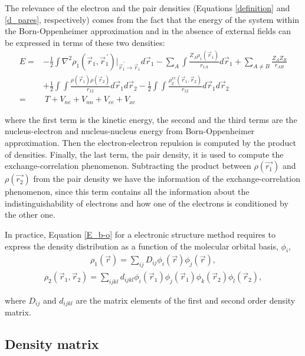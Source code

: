 The relevance of the electron and the pair densities (Equations
\ref{definition} and \ref{d_pares}, respectively) comes from the fact that the
energy of the system within the Born-Oppenheimer approximation and in the
absence of external fields can be expressed in terms of these two densities:
%
\begin{align}
  E=&-\frac{1}{2}\int\nabla^{2}\rho_{1}(\vec{r}_1,
    \vec{r}^{\,\prime}_1) \biggr |_{\vec{r}^{\,\prime}_1 \rightarrow \vec{r}_1}
    d\vec{r}_1 -\sum_{A}\int\frac{Z_A \rho_1 (\vec{r}_1)}{r_{1A}}d\vec{r}_1
    +\sum_{A\neq B}\frac{Z_A Z_{B}}{r_{AB}} \nonumber \\
  \phantom{=}&+\frac{1}{2}\int\int\frac{\rho (\vec{r}_1) \rho
    (\vec{r}_2)}{r_{12}} d\vec{r}_1 d\vec{r}_2
    -\frac{1}{2}\int\int\frac{\rho_2^{xc}(\vec{r}_1, \vec{r}_2)}{r_{12}} d\vec{r}_1
    d\vec{r}_2 \nonumber \\
  =&\ T + V_{ne} + V_{nn} + V_{ee} + V_{xc}
\label{E_b-o}
\end{align}

\noindent where the first term is the kinetic energy, the second and the third
terms are the nucleus-electron and nucleus-nucleus energy from Born-Oppenheimer
approximation. Then the electron-electron repulsion is computed by the product
of densities. Finally, the last term, the pair density, it is used to compute
the exchange-correlation phenomenon.  Subtracting the product between
$\rho(\vec{r_1})$ and $\rho(\vec{r_2})$ from the pair density we have the
information of the exchange-correlation phenomenon, since this term contains
all the information about the indistinguishability of electrons and how one of
the electrons is conditioned by the other one.

In practice, Equation \ref{E_b-o} for a electronic structure method requires to
express the density distribution as a function of the molecular orbital basis,
$\phi_i$,
%
\begin{align}
  \rho_1 (\vec{r}) = \sum_{ij} D_{ij}\phi_{i}(\vec{r})\phi_{j}(\vec{r}),
\end{align}
\begin{align}
  \rho_2 (\vec{r}_1, \vec{r}_2) = \sum_{ijkl}d_{ijkl}\phi_{i}(\vec{r}_1) \phi_{j}(\vec{r}_1)
  \phi_{k}(\vec{r}_2)\phi_{l}(\vec{r}_2),
\end{align}

\noindent where $D_{ij}$ and $d_{ijkl}$ are the matrix elements of the first
and second order density matrix.

\subsection{Density matrix}

